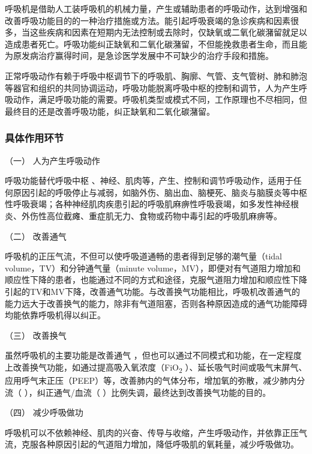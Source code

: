 呼吸机是借助人工装呼吸机的机械力量，产生或辅助患者的呼吸动作，达到增强和改善呼吸功能目的的一种治疗措施或方法。能引起呼吸衰竭的急诊疾病和因素很多，当这些疾病和因素在短期内无法控制或去除时，仅缺氧或二氧化碳潴留就足以造成患者死亡。呼吸功能纠正缺氧和二氧化碳潴留，不但能挽救患者生命，而且能为原发病治疗赢得时间，是急诊医学发展中不可缺少的治疗手段和措施。

正常呼吸动作有赖于呼吸中枢调节下的呼吸肌、胸廓、气管、支气管树、肺和肺泡等器官和组织的共同协调运动，呼吸功能脱离呼吸中枢的控制和调节，人为产生呼吸动作，满足呼吸功能的需要。呼吸机类型或模式不同，工作原理也不尽相同，但最终目的还是改善呼吸功能，纠正缺氧和二氧化碳潴留。

\subsubsection{具体作用环节}

\hypertarget{text00367.htmlux5cux23CHP16-3-1-1-1}{}
（一） 人为产生呼吸动作

呼吸功能替代呼吸中枢
、神经、肌肉等，产生、控制和调节呼吸动作，适用于任何原因引起的呼吸停止与减弱，如脑外伤、脑出血、脑梗死、脑炎与脑膜炎等中枢性呼吸衰竭；各种神经肌肉疾患引起的呼吸肌麻痹性呼吸衰竭，如多发性神经根炎、外伤性高位截瘫、重症肌无力、食物或药物中毒引起的呼吸肌麻痹等。

\hypertarget{text00367.htmlux5cux23CHP16-3-1-1-2}{}
（二） 改善通气

呼吸机的正压气流，不但可以使呼吸道通畅的患者得到足够的潮气量（tidal
volume，TV）和分钟通气量（minute
volume，MV），即便对有气道阻力增加和顺应性下降的患者，也能通过不同的方式和途径，克服气道阻力增加和顺应性下降引起的TV和MV下降，改善通气功能。与改善换气功能相比，呼吸机改善通气的能力远大于改善换气的能力，除非有气道阻塞，否则各种原因造成的通气功能障碍均能依靠呼吸机得以纠正。

\hypertarget{text00367.htmlux5cux23CHP16-3-1-1-3}{}
（三） 改善换气

虽然呼吸机的主要功能是改善通气
，但也可以通过不同模式和功能，在一定程度上改善换气功能，如通过提高吸入氧浓度（FiO\textsubscript{2}
）、延长吸气时间或吸气末屏气、应用呼气末正压（PEEP）等，改善肺内的气体分布，增加氧的弥散，减少肺内分流（{}
），纠正通气/血流（{} ）比例失调，最终达到改善换气功能的目的。

\hypertarget{text00367.htmlux5cux23CHP16-3-1-1-4}{}
（四） 减少呼吸做功

呼吸机可以不依赖神经、肌肉的兴奋、传导与收缩，产生呼吸动作，并依靠正压气流，克服各种原因引起的气道阻力增加，降低呼吸肌的氧耗量，减少呼吸做功。

